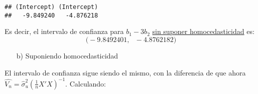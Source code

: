 \documentclass[
]{article}
\newenvironment{Shaded}{\begin{snugshade}}{\end{snugshade}}
\newcommand{\AttributeTok}[1]{\textcolor[rgb]{0.13,0.29,0.53}{#1}}
\newcommand{\DecValTok}[1]{\textcolor[rgb]{0.00,0.00,0.81}{#1}}
\newcommand{\FloatTok}[1]{\textcolor[rgb]{0.00,0.00,0.81}{#1}}
\newcommand{\FunctionTok}[1]{\textcolor[rgb]{0.13,0.29,0.53}{\textbf{#1}}}
\newcommand{\NormalTok}[1]{#1}
\newcommand{\OtherTok}[1]{\textcolor[rgb]{0.56,0.35,0.01}{#1}}
\newcommand{\SpecialCharTok}[1]{\textcolor[rgb]{0.81,0.36,0.00}{\textbf{#1}}}
\begin{document}
\begin{Shaded}
\end{Shaded}

\begin{verbatim}
## (Intercept) (Intercept) 
##   -9.849240   -4.876218
\end{verbatim}

Es decir, el intervalo de confianza para \(b_1 - 3b_2\)
\underline{sin suponer homocedasticidad} es: \[
\Big(-9.8492401 , \ \ \ -4.8762182\Big)
\]

\begin{itemize}
  \item[b)] Suponiendo homocedasticidad
\end{itemize}

El intervalo de confianza sigue siendo el mismo, con la diferencia de
que ahora \(\hat{V_n} = \hat{\sigma}_u^2(\frac{1}{n}X'X)^{-1}\).
Calculando:
\end{document}
